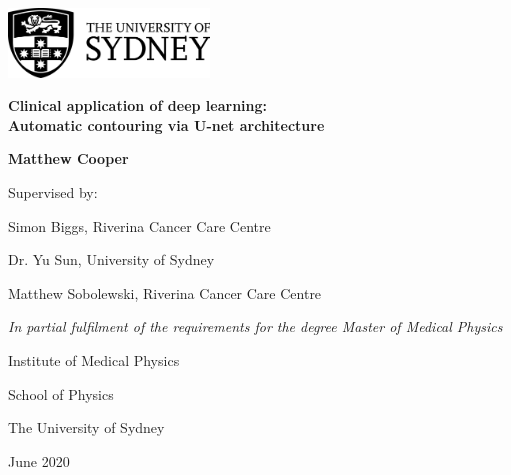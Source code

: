 \documentclass[a4paper,oneside, 12pt,parskip=half]{scrbook}
\begin{document}
\begin{titlepage}

\begin{center}
	\includegraphics[width=0.4\textwidth]{figures/usyd_logo}
\end{center}
	\vspace{2cm}
\begin{center}
	\LARGE\textbf{Clinical application of deep learning: \\ Automatic contouring via U-net architecture}
	\vfill

	\normalsize
  \large{\textbf{Matthew Cooper}}
  \vfill
	
	\normalsize
	Supervised by:

	Simon Biggs, Riverina Cancer Care Centre
  
	Dr. Yu Sun, University of Sydney
  
	Matthew Sobolewski, Riverina Cancer Care Centre 
	
	\vspace{1cm}
	
	\textit{In partial fulfilment of the requirements for the degree Master of Medical Physics}
	
	\vspace{1cm}
	
	Institute of Medical Physics
	
	School of Physics
	
	The University of Sydney
	
\vspace{1cm}
June 2020
	\vfill
  \end{center}
\end{titlepage}

\frontmatter
\tableofcontents




\listoffigures
\listoftables

\mainmatter








\backmatter
\small{\printbibliography[title=References]}
%
\end{document}
